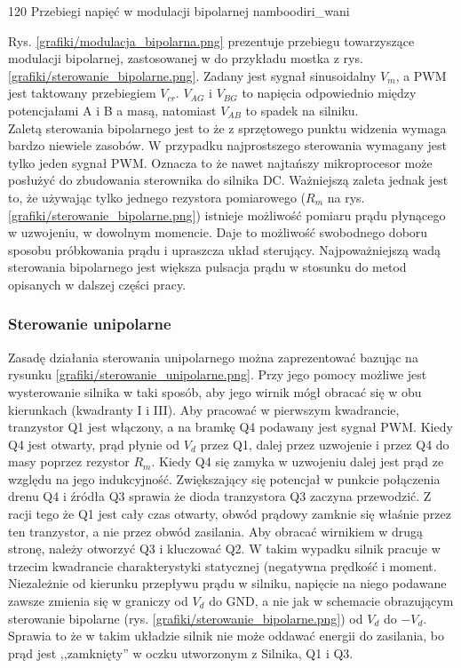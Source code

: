 	{120}
	{Przebiegi napięć w modulacji bipolarnej}
	{namboodiri_wani}
	
Rys. \ref{grafiki/modulacja_bipolarna.png} prezentuje przebiegu towarzyszące modulacji bipolarnej, zastosowanej w do przykładu mostka z rys. \ref{grafiki/sterowanie_bipolarne.png}. Zadany jest sygnał sinusoidalny $ V_m $, a PWM jest taktowany przebiegiem $ V_{cr} $. $ V_{AG} $ i $ V_{BG} $ to napięcia odpowiednio między potencjałami A i B a masą, natomiast $ V_{AB} $ to spadek na silniku. \\

Zaletą sterowania bipolarnego jest to że z sprzętowego punktu widzenia wymaga bardzo niewiele zasobów. W przypadku najprostszego sterowania wymagany jest tylko jeden sygnał PWM. Oznacza to że nawet najtańszy mikroprocesor może posłużyć do zbudowania sterownika do silnika DC. Ważniejszą zaleta jednak jest to, że używając tylko jednego rezystora pomiarowego ($ R_m $ na rys. \ref{grafiki/sterowanie_bipolarne.png}) istnieje możliwość pomiaru prądu płynącego w uzwojeniu, w dowolnym momencie. Daje to możliwość swobodnego doboru sposobu próbkowania prądu i upraszcza układ sterujący. Najpoważniejszą wadą sterowania bipolarnego jest większa pulsacja prądu w stosunku do metod opisanych w dalszej części pracy.

\subsubsection{Sterowanie unipolarne}

Zasadę działania sterowania unipolarnego można zaprezentować bazując na rysunku \ref{grafiki/sterowanie_unipolarne.png}. Przy jego pomocy możliwe jest wysterowanie silnika w taki sposób, aby jego wirnik mógł obracać się w obu kierunkach (kwadranty I i III). Aby pracować w pierwszym kwadrancie, tranzystor Q1 jest włączony, a na bramkę Q4 podawany jest sygnał PWM. Kiedy Q4 jest otwarty, prąd płynie od $ V_d $ przez Q1, dalej przez uzwojenie i przez Q4 do masy poprzez rezystor $ R_m $. Kiedy Q4 się zamyka w uzwojeniu dalej jest prąd ze względu na jego indukcyjność. Zwiększający się potencjał w punkcie połączenia drenu Q4 i źródła Q3 sprawia że dioda tranzystora Q3 zaczyna przewodzić. Z racji tego że Q1 jest cały czas otwarty, obwód prądowy zamknie się właśnie przez ten tranzystor, a nie przez obwód zasilania. Aby obracać wirnikiem w drugą stronę, należy otworzyć Q3 i kluczować Q2. W takim wypadku silnik pracuje w trzecim kwadrancie charakterystyki statycznej (negatywna prędkość i moment. Niezależnie od kierunku przepływu prądu w silniku, napięcie na niego podawane zawsze zmienia się w graniczy od $ V_d $ do GND, a nie jak w schemacie obrazującym sterowanie bipolarne (rys. \ref{grafiki/sterowanie_bipolarne.png}) od $ V_d $ do $ -V_d $. Sprawia to że w takim układzie silnik nie może oddawać energii do zasilania, bo prąd jest ,,zamknięty'' w oczku utworzonym z Silnika, Q1 i Q3. 

